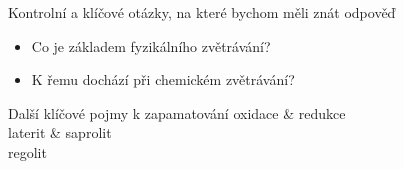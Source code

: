 %
%
%
%

\newpage
\onecolumn
\begin{boxotazky}{Kontrolní a klíčové otázky, na které bychom měli znát odpověď}
	\begin{itemize}
		\item Co je základem fyzikálního zvětrávání?
		\item K řemu dochází při chemickém zvětrávání?
		
	\end{itemize}
\end{boxotazky}

\begin{boxslovnik}{Další klíčové pojmy k zapamatování}
	oxidace & redukce \\
	laterit & saprolit \\
	regolit \\
\end{boxslovnik}
\twocolumn